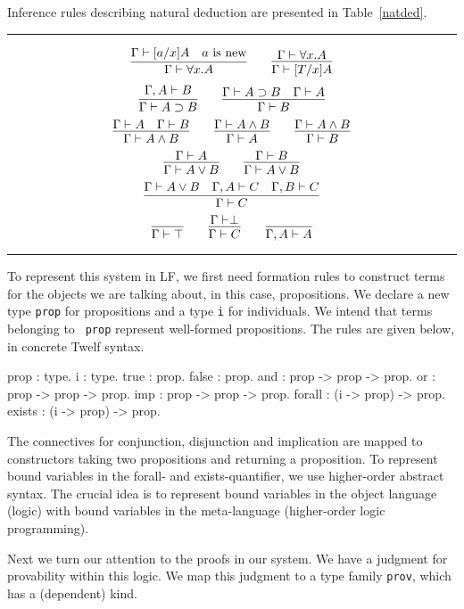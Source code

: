 \documentclass{acmconf}
\newcommand{\figfoot}{\vspace{1ex}\hrule}
\newcommand{\fighead}{\hrule\vspace{1.5ex}}
\begin{document}
Inference rules describing natural deduction are presented in Table~\ref{natded}.

\begin{table}[h]
\fighead
\[
\infer{\Gamma\vdash \forall x. A}
{\Gamma\vdash [a/x]A & a \mbox{ is new}}
\qquad
\infer{\Gamma\vdash [T/x]A}
{\Gamma\vdash \forall x.A}
\]
\[
\infer{\Gamma\vdash A\supset B}
{\Gamma,A\vdash B}
\qquad
\infer{\Gamma\vdash B}
{\Gamma\vdash A\supset B
\quad
\Gamma\vdash A}
\]
\[
\infer{\Gamma\vdash A\wedge B}
{\Gamma\vdash A\quad \Gamma\vdash B}
\qquad
\infer{\Gamma\vdash A}
{\Gamma\vdash A\wedge B}
\qquad
\infer{\Gamma\vdash B}
{\Gamma\vdash A\wedge B}
\]
\[
\infer{\Gamma\vdash A\vee B}
{\Gamma\vdash A}
\qquad
\infer{\Gamma\vdash A\vee B}
{\Gamma\vdash B}
\]
\[
\infer{\Gamma\vdash C}
{\Gamma\vdash A\vee B
\quad
\Gamma,A\vdash C
\quad
\Gamma,B\vdash C
}
\]
\[
\infer{\Gamma\vdash\top}
{}
\qquad
\infer{\Gamma\vdash C}
{\Gamma\vdash\perp}
\qquad
\infer{\Gamma, A \vdash A}
{}
\]
\caption{\label{natded}A natural deduction system}
\figfoot
\end{table}

To represent this system in LF, we first need formation rules to
construct terms for the objects we are talking about, in this case,
propositions. We declare a new type {\tt prop} for propositions and a
type {\tt i} for individuals. We intend that terms belonging to {\tt
  prop} represent well-formed propositions. The rules are given below,
in concrete Twelf syntax. 

\begin{code}
prop : type.
i    : type.
\vspace{0.1in}
true   : prop.
false  : prop.
and    : prop -> prop -> prop.
or     : prop -> prop -> prop.
imp    : prop -> prop -> prop.
forall : (i -> prop) -> prop.
exists : (i -> prop) -> prop.
\end{code}

The connectives for conjunction, disjunction and implication are
mapped to constructors taking two propositions and returning a
proposition. To represent bound variables in the forall- and
exists-quantifier, we use higher-order abstract syntax. The crucial
idea is to represent bound variables in the object language (logic)
with bound variables in the meta-language (higher-order logic
programming). 

Next we turn our attention to the proofs in our system. We have a
judgment for provability within this logic. We map this judgment to
a type family {\tt prov}, which has a (dependent) kind.
\end{document}
